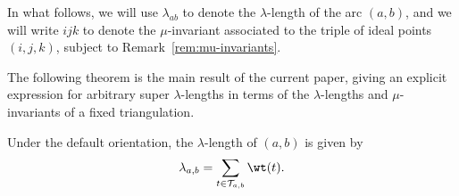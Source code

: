  In what follows, we will use $\lambda_{ab}$ to denote the $\lambda$-length of the arc $(a,b)$,
 and we will write $\boxed{ijk}$ to denote the $\mu$-invariant associated to the triple of
 ideal points $(i,j,k)$, subject to Remark~\ref{rem:mu-invariants}.
	
The following theorem is the main result of the current paper, giving an explicit expression for arbitrary super $\lambda$-lengths
in terms of the $\lambda$-lengths and $\mu$-invariants of a fixed triangulation.

\begin{Theorem}\label{thm:main}
Under the default orientation,
 the $\lambda$-length of $(a,b)$ is given by
 \[\lambda_{a,b} = \sum_{t\in\mathcal T_{a,b}} \wt(t).
 \]
\end{Theorem}
